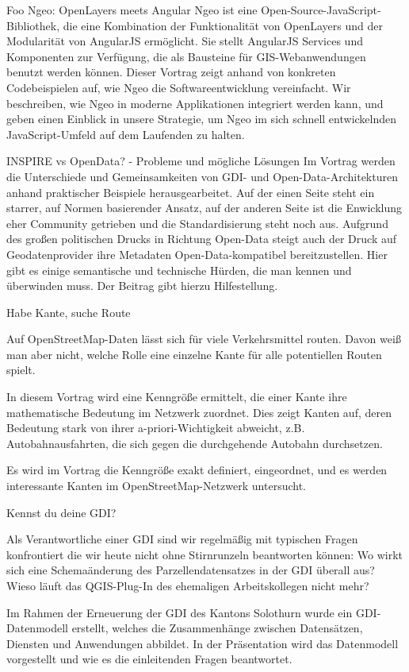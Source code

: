 \newpage
Foo
\renewcommand{\konferenztag}{\dienstag}
%
{Ngeo: OpenLayers meets Angular}%
{}%
{Ngeo ist eine Open-Source-JavaScript-Bibliothek, die eine Kombination der Funktionalität von
OpenLayers und der Modularität von AngularJS ermöglicht. Sie stellt AngularJS Services und
Komponenten zur Verfügung, die als Bausteine für GIS-Webanwendungen benutzt werden können. Dieser
Vortrag zeigt anhand von konkreten Codebeispielen auf, wie Ngeo die Softwareentwicklung vereinfacht.
Wir beschreiben, wie Ngeo in moderne Applikationen integriert werden kann, und geben einen Einblick
in unsere Strategie, um Ngeo im sich schnell entwickelnden JavaScript-Umfeld auf dem Laufenden zu
halten.}


%
{INSPIRE vs OpenData? - Probleme und mögliche Lösungen}%
{}%
{Im Vortrag werden die Unterschiede und Gemeinsamkeiten von GDI- und Open-Data-Architekturen anhand
praktischer Beispiele herausgearbeitet. Auf der einen Seite steht ein starrer, auf Normen
basierender Ansatz, auf der anderen Seite ist die Enwicklung eher Community getrieben und die
Standardisierung steht noch aus. Aufgrund des großen politischen Drucks in Richtung Open-Data steigt
auch der Druck auf Geodatenprovider ihre Metadaten Open-Data-kompatibel bereitzustellen. Hier gibt
es einige semantische und technische Hürden, die man kennen und überwinden muss. Der Beitrag gibt
hierzu Hilfestellung.}

%
{Habe Kante, suche Route}%
{}%
{Auf OpenStreetMap-Daten lässt sich für viele Verkehrsmittel routen. Davon weiß man aber nicht,
  welche Rolle eine einzelne Kante für alle potentiellen Routen spielt.

In diesem Vortrag wird eine Kenngröße ermittelt, die einer Kante ihre mathematische Bedeutung im
Netzwerk zuordnet. Dies zeigt Kanten auf, deren Bedeutung stark von ihrer a-priori-Wichtigkeit
abweicht, z.B. Autobahnausfahrten, die sich gegen die durchgehende Autobahn durchsetzen.

Es wird im Vortrag die Kenngröße exakt definiert, eingeordnet,
und es werden interessante Kanten im OpenStreetMap-Netzwerk untersucht.
}

%
{Kennst du deine GDI?}%
{}%
{Als Verantwortliche einer GDI sind wir regelmäßig mit typischen Fragen konfrontiert die wir heute
  nicht ohne Stirnrunzeln beantworten können: Wo wirkt sich eine Schemaänderung des
  Parzellendatensatzes in der GDI überall aus? Wieso läuft das QGIS-Plug-In des ehemaligen
  Arbeitskollegen nicht mehr?

Im Rahmen der Erneuerung der GDI des Kantons Solothurn wurde ein GDI-Datenmodell erstellt, welches
die Zusammenhänge zwischen Datensätzen, Diensten und Anwendungen abbildet. In der Präsentation wird
das Datenmodell vorgestellt und wie es die einleitenden Fragen beantwortet.}

